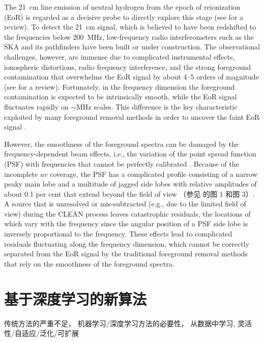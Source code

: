 The \SI{21}{\cm} line emission of neutral hydrogen from the epoch of
reionization (EoR) is regarded as a decisive probe to directly explore
this stage (see  for a review).
To detect the \SI{21}{\cm} signal, which is believed to have been
redshifted to the frequencies below \SI{200}{\MHz}, low-frequency
radio interferometers such as the SKA \cite{koopmans2015} and its
pathfinders have been built or under construction.
The observational challenges, however, are immense due to
complicated instrumental effects, ionospheric distortions, radio frequency
interference, and the strong foreground contamination that
overwhelms the EoR signal by about \numrange{4}{5} orders of magnitude
(see  for a review).
Fortunately, in the frequency dimension the foreground contamination
is expected to be intrinsically smooth, while the EoR signal fluctuates
rapidly on $\sim\si{\MHz}$ scales.
This difference is the key characteristic exploited by many foreground
removal methods in order to uncover the faint EoR signal
\cite{wang2006,jelic2008,liu2009fgrm,harker2009,chapman2012,
  chapman2013,wang2013,gu2013,bonaldi2015,mertens2018}.

However, the smoothness of the foreground spectra can be damaged
by the frequency-dependent beam effects, i.e., the variation of the point
spread function (PSF) with frequencies that cannot be perfectly
calibrated \cite{liu2009ps}.
Because of the incomplete $uv$ coverage,
the PSF has a complicated profile consisting of a narrow peaky main lobe
and a multitude of jagged side lobes with relative amplitudes of about
0.1 per cent that extend beyond the field of view
（参见  的图 1 和图 3）.
A source that is unresolved or mis-subtracted (e.g., due to the limited
field of view) during the CLEAN process leaves catastrophic residuals,
the locations of which vary with the frequency since the angular
position of a PSF side lobe is inversely proportional to the frequency.
These effects lead to complicated residuals fluctuating along the
frequency dimension, which cannot be correctly separated from the EoR
signal by the traditional foreground removal methods that rely on
the smoothness of the foreground spectra.


\section{基于深度学习的新算法}

传统方法的严重不足，
机器学习/深度学习方法的必要性，
从数据中学习, 灵活性/自适应/泛化/可扩展

